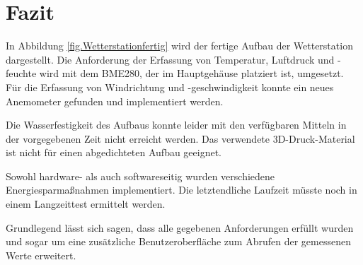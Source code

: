 \section{Fazit}\label{sec:fazit}
In Abbildung \ref{fig.Wetterstationfertig} wird der fertige Aufbau der Wetterstation dargestellt. Die Anforderung der Erfassung von Temperatur, Luftdruck und -feuchte wird mit dem BME280, der im Hauptgehäuse platziert ist, umgesetzt. Für die Erfassung von Windrichtung und -geschwindigkeit konnte ein neues Anemometer gefunden und implementiert werden.

Die Wasserfestigkeit des Aufbaus konnte leider mit den verfügbaren Mitteln in der vorgegebenen Zeit nicht erreicht werden. Das verwendete 3D-Druck-Material ist nicht für einen abgedichteten Aufbau geeignet. 

Sowohl hardware- als auch softwareseitig wurden verschiedene Energiesparmaßnahmen implementiert. Die letztendliche Laufzeit müsste noch in einem Langzeittest ermittelt werden.

Grundlegend lässt sich sagen, dass alle gegebenen Anforderungen erfüllt wurden und sogar um eine zusätzliche Benutzeroberfläche zum Abrufen der gemessenen Werte erweitert.


